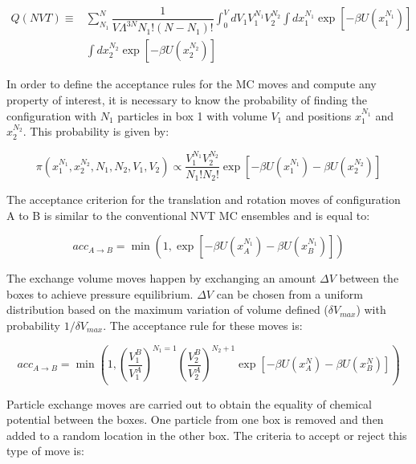 \begin{equation}
\begin{aligned}
Q(NVT) {} \equiv & \sum_{N_{1}}^{N} \dfrac{1}{V \Lambda ^{3N} N_{1}!(N-N_{1})!} \int_{0}^{V} dV_{1} V_{1}^{N_{1}} V_{2}^{N_{2}} \int dx_{1}^{N_{1}} \exp[-\beta U(x_{1}^{N_{1}})] \\
& \int dx_{2}^{N_{2}} \exp[-\beta U(x_{2}^{N_{2}})]
\end{aligned}
\label{eqn:gepart}
\end{equation}

In order to define the acceptance rules for the MC moves and compute any property of interest, it is necessary to know the probability of finding the configuration with $N_{1}$ particles in box 1 with volume $V_{1}$ and positions $x_{1}^{N_{1}}$ and $x_{2}^{N_{2}}$. This probability is given by:

\begin{equation}
\pi(x_{1}^{N_{1}},x_{2}^{N_{2}},N_{1},N_{2},V_{1},V_{2}) \propto \dfrac{V_{1}^{N_{1}}V_{2}^{N_{2}}}{N_{1}!N_{2}!} \exp[-\beta U(x_{1}^{N_{1}}) -\beta U(x_{2}^{N_{2}})]
\label{eqn:geprob}
\end{equation}

The acceptance criterion for the translation and rotation moves of configuration A	to B is similar to the conventional NVT MC ensembles and is equal to:

\begin{equation}
acc_{A \rightarrow B} = \min(1,\exp[-\beta U(x_{A}^{N_{1}}) -\beta U(x_{B}^{N_{1}})])
\label{eqn:drprob}
\end{equation} 

The exchange volume moves happen by exchanging an amount $\Delta V$ between the boxes to achieve pressure equilibrium. $\Delta V$ can be chosen from a uniform distribution based on the maximum variation of volume defined ($\delta V_{max}$) with probability $1/\delta V_{max}$. The acceptance rule for these moves is: 

\begin{equation}
acc_{A \rightarrow B} = \min \left(1, \left(\dfrac{V_{1}^{B}}{V_{1}^{A}} \right)^{N_{1}=1} \left( \dfrac{V_{2}^{B}}{V_{2}^{A}} \right)^{N_{2}+1} \exp[-\beta U(x_{A}^{N}) -\beta U(x_{B}^{N})] \right)
\label{vprob}
\end{equation}

Particle exchange moves are carried out to obtain the equality of chemical potential between the boxes. One particle from one box is removed and then added to a random location in the other box. The criteria to accept or reject this type of move is:

